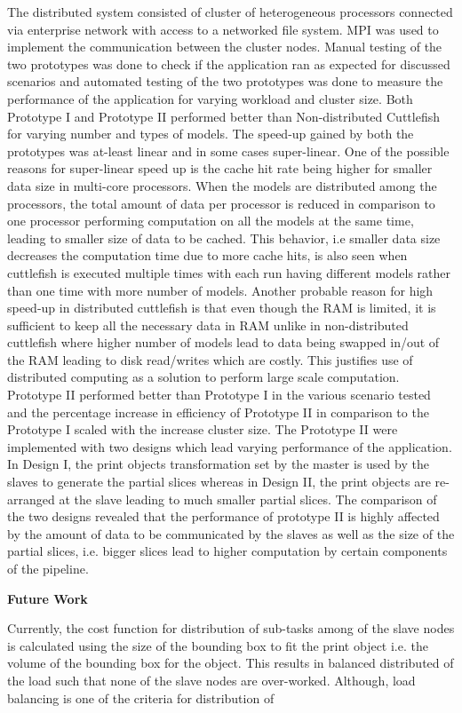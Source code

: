 The distributed system consisted of cluster of heterogeneous processors connected via enterprise network with access to a networked file system. MPI was used to implement the communication between the cluster nodes. Manual testing of the two prototypes was done to check if the application ran as expected for discussed scenarios and automated testing of the two prototypes was done to measure the performance of the application for varying workload and cluster size. Both Prototype I and Prototype II performed better than Non-distributed Cuttlefish for varying number and types of models. The speed-up gained by both the prototypes was at-least linear and in some cases super-linear. One of the possible reasons for super-linear speed up is the cache hit rate being higher for smaller data size in multi-core processors. When the models are distributed among the processors, the total amount of data per processor is reduced in comparison to one processor performing computation on all the models at the same time, leading to smaller size of data to be cached. This behavior, i.e smaller data size decreases the computation time due to more cache hits, is also seen when cuttlefish is executed multiple times with each run having different models rather than one time with more number of models. Another probable reason for high speed-up in distributed cuttlefish is that even though the RAM is limited, it is sufficient to keep all the necessary data in RAM unlike in non-distributed cuttlefish where higher number of models lead to data being swapped in/out of the RAM leading to disk read/writes which are costly. This justifies use of distributed computing as a solution to perform large scale computation. \newline
Prototype II performed better than Prototype I in the various scenario tested and the percentage increase in efficiency of Prototype II in comparison to the Prototype I scaled with the increase cluster size. The Prototype II were implemented with two designs which lead varying performance of the application. In Design I, the print objects transformation set by the master is used by the slaves to generate the partial slices whereas in Design II, the print objects are re-arranged at the slave leading to much smaller partial slices. The comparison of the two designs revealed that the performance of prototype II is highly affected by the amount of data to be communicated by the slaves as well as the size of the partial slices, i.e. bigger slices lead to higher computation by certain components of the pipeline. \newline

\textbf{Future Work} \newline

Currently, the cost function for distribution of sub-tasks among of the slave nodes is calculated using the size of the bounding box to fit the print object i.e. the volume of the bounding box for the object. This results in balanced distributed of the load such that none of the slave nodes are over-worked. Although, load balancing is one of the criteria for distribution of  

